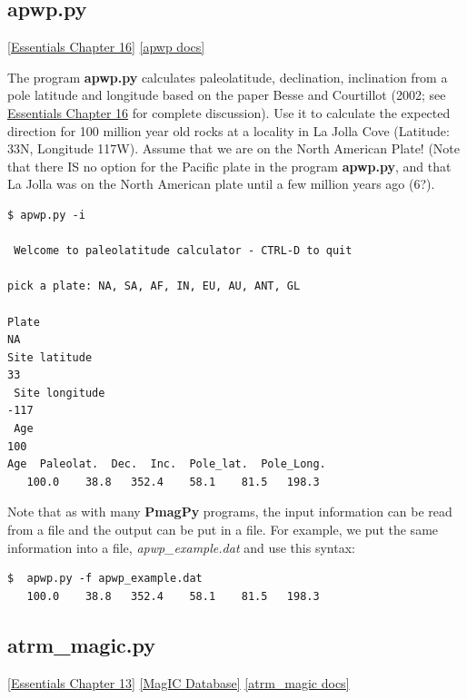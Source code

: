 \documentclass[11pt]{book}
\begin{document}
{

\subsection{apwp.py }
\href{http://earthref.org/MAGIC/books/Tauxe/Essentials/WebBook3ch16.html#ch16}{[Essentials Chapter 16]}
\href{https://github.com/PmagPy/PmagPy/blob/master/programs/apwp.py}{[apwp docs]}

The program {\bf apwp.py} calculates paleolatitude, declination, inclination from  a pole latitude and longitude based on  the paper Besse and Courtillot (2002; see  \href{http://earthref.org/MAGIC/books/Tauxe/Essentials/WebBook3ch16.html#apparent_polar_wander_path}{Essentials Chapter 16} for complete discussion).  \nocite{besse02}
Use it  to calculate the expected direction for 100 million year old rocks at a locality in La Jolla Cove (Latitude: 33N, Longitude 117W).    Assume that we are on the North American Plate!  (Note that there IS no option for the Pacific plate in the program {\bf apwp.py}, and that La Jolla was on the North American plate until a few million years ago (6?).

\begin{verbatim}
$ apwp.py -i

 Welcome to paleolatitude calculator - CTRL-D to quit

pick a plate: NA, SA, AF, IN, EU, AU, ANT, GL

Plate
NA
Site latitude
33
 Site longitude
-117
 Age
100
Age  Paleolat.  Dec.  Inc.  Pole_lat.  Pole_Long.
   100.0    38.8   352.4    58.1    81.5   198.3

\end{verbatim}

Note that as with many {\bf PmagPy}  programs, the input information can be read from a file and the output can be put in a file.   For example, we put the same information into a file, {\it apwp\_example.dat} and use this syntax:

\begin{verbatim}
$  apwp.py -f apwp_example.dat
   100.0    38.8   352.4    58.1    81.5   198.3
\end{verbatim}


\subsection{atrm\_magic.py}
{ \href{http://earthref.org/MAGIC/books/Tauxe/Essentials/WebBook3ch13.html#ch13}{[Essentials Chapter 13]}
\href{#MagICDatabase}{[MagIC Database]}
\href{https://github.com/PmagPy/PmagPy/blob/master/programs/atrm_magic.py}{[atrm\_magic docs]}

}}
\end{document}
